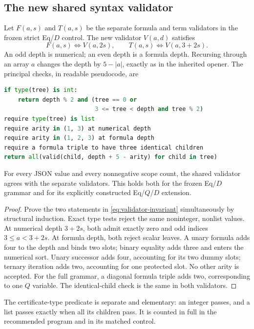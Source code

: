 \subsection{The new shared syntax validator}

Let $F(a,s)$ and $T(a,s)$ be the separate formula and term validators in
the frozen strict Eq/$D$ control. The new validator $V(a,d)$ satisfies
\[
 F(a,s)\iff V(a,2s),\qquad T(a,s)\iff V(a,3+2s).
 \tag{Scope invariant}\label{eq:validator-invariant}
\]
An odd depth is numerical; an even depth is a formula depth. Recursing
through an array $a$ changes the depth by $5-|a|$, exactly as in the
inherited opener. The principal checks, in readable pseudocode, are
\begin{lstlisting}[language=Python]
if type(tree) is int:
    return depth % 2 and (tree == 0 or
                          3 <= tree < depth and tree % 2)
require type(tree) is list
require arity in (1, 3) at numerical depth
require arity in (1, 2, 3) at formula depth
require a formula triple to have three identical children
return all(valid(child, depth + 5 - arity) for child in tree)
\end{lstlisting}

\begin{proposition}\label{prop:validator}
For every JSON value and every nonnegative scope count, the shared
validator agrees with the separate validators. This holds both for
the frozen Eq/$D$ grammar and for its explicitly constructed Eq/$Q$/$D$
extension.
\end{proposition}
\begin{proof}
Prove the two statements in \eqref{eq:validator-invariant} simultaneously
by structural induction. Exact type tests reject the same noninteger,
nonlist values. At numerical depth $3+2s$, both admit exactly zero and
odd indices $3\le a<3+2s$. At formula depth, both reject scalar leaves.
A unary formula adds four to the depth and binds two slots; binary
equality adds three and enters the numerical sort. Unary successor adds
four, accounting for its two dummy slots; ternary iteration adds two,
accounting for one protected slot. No other arity is accepted. For the
full grammar, a diagonal formula triple adds two, corresponding to one
$Q$ variable. The identical-child check is the same in both validators.
\end{proof}

The certificate-type predicate is separate and elementary: an integer
passes, and a list passes exactly when all its children pass. It is
counted in full in the recommended program and in its matched control.


